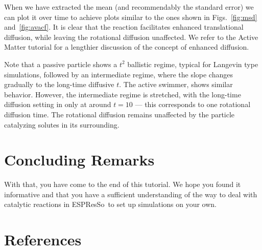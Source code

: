 \documentclass[aip,jcp,reprint,a4paper,onecolumn,nofootinbib,amsmath,amssymb]{revtex4-1}
\newcommand{\es}{\mbox{\textsf{ESPResSo}}\xspace}
\begin{document}
When we have extracted the mean (and recommendably the standard error) we can plot it over time to achieve plots similar to the ones shown in Figs.~\ref{fig:msd} and~\ref{fig:avacf}. It is clear that the reaction facilitates enhanced translational diffusion, while leaving the rotational diffusion unaffected. We refer to the Active Matter tutorial for a lengthier discussion of the concept of enhanced diffusion.

Note that a passive particle shows a $t^{2}$ ballistic regime, typical for Langevin type simulations, followed by an intermediate regime, where the slope changes gradually to the long-time diffusive $t$. The active swimmer, shows similar behavior. However, the intermediate regime is stretched, with the long-time diffusion setting in only at around $t = 10$  --- this corresponds to one rotational diffusion time. The rotational diffusion remains unaffected by the particle catalyzing solutes in its surrounding.

\section{Concluding Remarks}

With that, you have come to the end of this tutorial. We hope you found it informative and that you have a sufficient understanding of the way to deal with catalytic reactions in \es\ to set up simulations on your own.

\section*{References}



\end{document}
